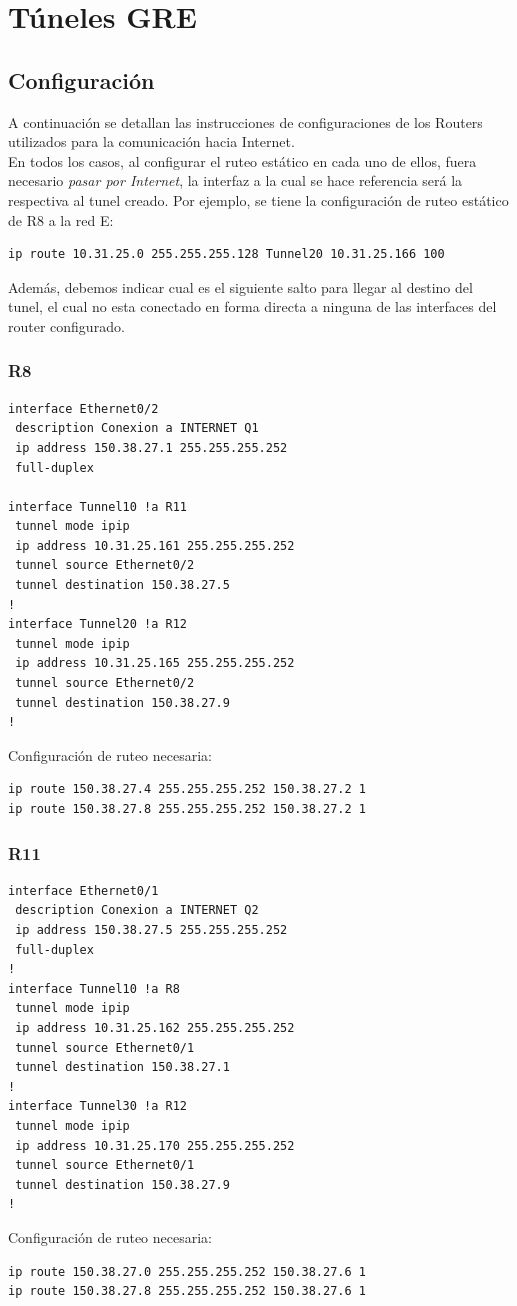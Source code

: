 \section{Túneles GRE}

\subsection{Configuración}
A continuación se detallan las instrucciones de configuraciones de los Routers utilizados para la comunicación hacia Internet.\\
En todos los casos, al configurar el ruteo estático en cada uno de ellos, fuera necesario \textit{pasar por Internet}, la interfaz a la cual se hace referencia será la respectiva al tunel creado. Por ejemplo, se tiene la configuración de ruteo estático de R8 a la red E:
\begin{verbatim}
ip route 10.31.25.0 255.255.255.128 Tunnel20 10.31.25.166 100
\end{verbatim}
Además, debemos indicar cual es el siguiente salto para llegar al destino del tunel, el cual no esta conectado en forma directa a ninguna de las interfaces del router configurado.

\subsubsection{R8}
\begin{verbatim}
interface Ethernet0/2
 description Conexion a INTERNET Q1
 ip address 150.38.27.1 255.255.255.252
 full-duplex

interface Tunnel10 !a R11
 tunnel mode ipip
 ip address 10.31.25.161 255.255.255.252
 tunnel source Ethernet0/2
 tunnel destination 150.38.27.5
!
interface Tunnel20 !a R12
 tunnel mode ipip
 ip address 10.31.25.165 255.255.255.252
 tunnel source Ethernet0/2
 tunnel destination 150.38.27.9
!
\end{verbatim}
Configuración de ruteo necesaria:
\begin{verbatim}
ip route 150.38.27.4 255.255.255.252 150.38.27.2 1
ip route 150.38.27.8 255.255.255.252 150.38.27.2 1
\end{verbatim}


\subsubsection{R11}
\begin{verbatim}
interface Ethernet0/1
 description Conexion a INTERNET Q2
 ip address 150.38.27.5 255.255.255.252
 full-duplex
!
interface Tunnel10 !a R8
 tunnel mode ipip
 ip address 10.31.25.162 255.255.255.252
 tunnel source Ethernet0/1
 tunnel destination 150.38.27.1
!
interface Tunnel30 !a R12
 tunnel mode ipip
 ip address 10.31.25.170 255.255.255.252
 tunnel source Ethernet0/1
 tunnel destination 150.38.27.9
!
\end{verbatim}
Configuración de ruteo necesaria:
\begin{verbatim}
ip route 150.38.27.0 255.255.255.252 150.38.27.6 1
ip route 150.38.27.8 255.255.255.252 150.38.27.6 1
\end{verbatim}

